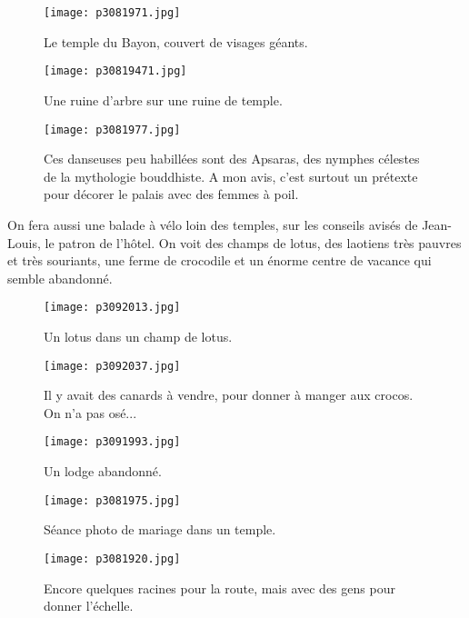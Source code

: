 \documentclass{book}
\begin{document}
\begin{figure}[h]
\centering
\texttt{[image: p3081971.jpg]}
\caption*{Le temple du Bayon, couvert de visages géants.}
\end{figure}


\begin{figure}[h]
\centering
\texttt{[image: p30819471.jpg]}
\caption*{Une ruine d'arbre sur une ruine de temple.}
\end{figure}


\begin{figure}[h]
\centering
\texttt{[image: p3081977.jpg]}
\caption*{Ces danseuses peu habillées sont des Apsaras, des nymphes célestes de la mythologie bouddhiste. A mon avis, c'est surtout un prétexte pour décorer le palais avec des femmes à poil.}
\end{figure}

On fera aussi une balade à vélo loin des temples, sur les conseils avisés de Jean-Louis, le patron de l'hôtel. On voit des champs de lotus, des laotiens très pauvres et très souriants, une ferme de crocodile et un énorme centre de vacance qui semble abandonné.


\begin{figure}[h]
\centering
\texttt{[image: p3092013.jpg]}
\caption*{Un lotus dans un champ de lotus.}
\end{figure}


\begin{figure}[h]
\centering
\texttt{[image: p3092037.jpg]}
\caption*{Il y avait des canards à vendre, pour donner à manger aux crocos. On n'a pas osé...}
\end{figure}


\begin{figure}[h]
\centering
\texttt{[image: p3091993.jpg]}
\caption*{Un lodge abandonné.}
\end{figure}


\begin{figure}[h]
\centering
\texttt{[image: p3081975.jpg]}
\caption*{Séance photo de mariage dans un temple.}
\end{figure}


\begin{figure}[h]
\centering
\texttt{[image: p3081920.jpg]}
\caption*{Encore quelques racines pour la route, mais avec des gens pour donner l'échelle.}
\end{figure}
\end{document}
